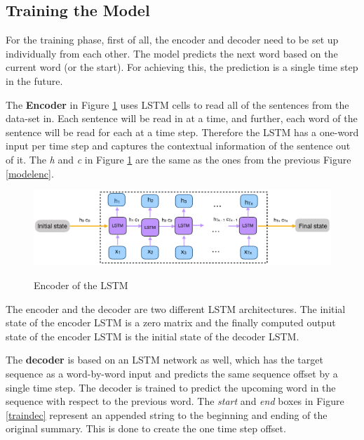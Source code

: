 \subsection{Training the Model}

For the training phase, first of all, the encoder and decoder need to be set up individually from each other. The model predicts the next word based on the current word (or the start). For achieving this, the prediction is a single time step in the future. 

The \textbf{Encoder} in Figure \ref{trainenc} uses LSTM cells to read all of the sentences from the data-set in. Each sentence will be read in at a time, and further, each word of the sentence will be read for each at a time step. Therefore the LSTM has a one-word input per time step and captures the contextual information of the sentence out of it.  The \textit{h} and \textit{c} in Figure \ref{trainenc} are the same as the ones from the previous Figure \ref{modelenc}. 

\begin{figure}
	\begin{center}
		\includegraphics[width=6in]{photos/trainenc-1}\\
		\caption{Encoder of the LSTM}\label{trainenc}
	\end{center}
\end{figure}

The encoder and the decoder are two different LSTM architectures. The initial state of the encoder LSTM is a zero matrix and the finally computed output state of the encoder LSTM is the initial state of the decoder LSTM.

The \textbf{ decoder} is based on an LSTM network as well, which has the target sequence as a word-by-word input and predicts the same sequence offset by a single time step. The decoder is trained to predict the upcoming word in the sequence with respect to the previous word. The \textit{start} and \textit{end} boxes in Figure \ref{traindec} represent an appended string to the beginning and ending of the original summary. This is done to create the one time step offset.

